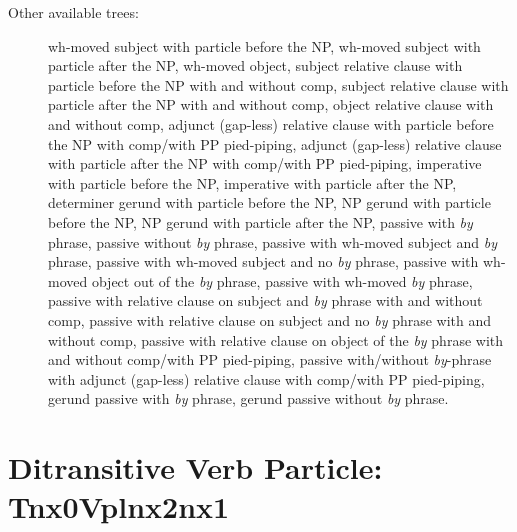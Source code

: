 \begin{description}
\item[Other available trees:] wh-moved subject with particle before the NP,
wh-moved subject with particle after the NP, wh-moved object, subject
relative clause with particle before the NP with and without comp, subject relative clause with
particle after the NP with and without comp, object relative clause with and without comp, 
adjunct (gap-less) relative clause with particle before the NP with comp/with PP pied-piping,
adjunct (gap-less) relative clause with particle after the NP with comp/with PP pied-piping,
imperative with particle before the NP, imperative with particle after the NP, determiner gerund
with particle before the NP, NP gerund with particle before the NP, NP
gerund with particle after the NP, passive with {\it by} phrase, passive
without {\it by} phrase, passive with wh-moved subject and {\it by} phrase,
passive with wh-moved subject and no {\it by} phrase, passive with wh-moved
object out of the {\it by} phrase, passive with wh-moved {\it by} phrase,
passive with relative clause on subject and {\it by} phrase with and without comp, passive with
relative clause on subject and no {\it by} phrase with and without comp, passive with relative
clause on object of the {\it by} phrase with and without comp/with PP pied-piping, 
passive with/without {\it by}-phrase with adjunct (gap-less) relative clause
with comp/with PP pied-piping, gerund passive with {\it by}
phrase, gerund passive without {\it by} phrase.

\end{description}




\section{Ditransitive Verb Particle: Tnx0Vplnx2nx1}
\label{nx0Vplnx1nx2}

